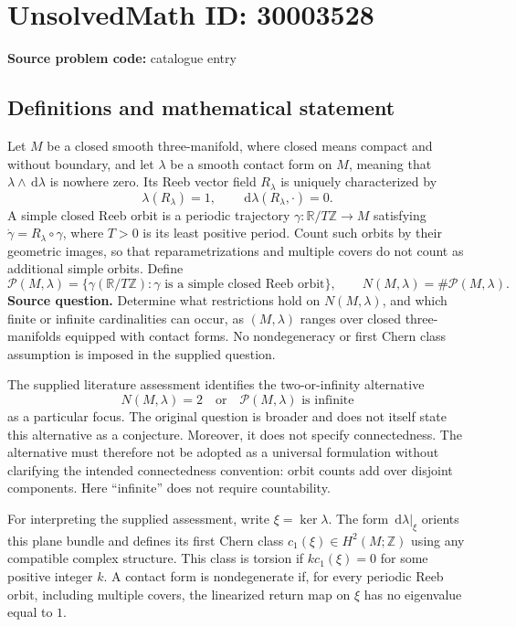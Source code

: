 \documentclass[11pt]{article}
\newcommand{\Z}{\mathbb{Z}}
\newcommand{\R}{\mathbb{R}}
\newcommand{\dd}{\,\mathrm{d}}
\begin{document}
\section*{UnsolvedMath ID: 30003528}
\textbf{Source problem code:} catalogue entry
\subsection{Definitions and mathematical statement}
Let \(M\) be a closed smooth three-manifold, where closed means compact and without boundary, and let \(\lambda\) be a smooth contact form on \(M\), meaning that \(\lambda\wedge\dd\lambda\) is nowhere zero. Its Reeb vector field \(R_\lambda\) is uniquely characterized by
\[
\lambda(R_\lambda)=1,\qquad \dd\lambda(R_\lambda,\cdot)=0.
\]
A simple closed Reeb orbit is a periodic trajectory \(\gamma:\R/T\Z\to M\) satisfying \(\dot\gamma=R_\lambda\circ\gamma\), where \(T>0\) is its least positive period. Count such orbits by their geometric images, so that reparametrizations and multiple covers do not count as additional simple orbits. Define
\[
\mathcal P(M,\lambda)=\{\gamma(\R/T\Z):\gamma\text{ is a simple closed Reeb orbit}\},\qquad
N(M,\lambda)=\#\mathcal P(M,\lambda).
\]
\textbf{Source question.} Determine what restrictions hold on \(N(M,\lambda)\), and which finite or infinite cardinalities can occur, as \((M,\lambda)\) ranges over closed three-manifolds equipped with contact forms. No nondegeneracy or first Chern class assumption is imposed in the supplied question.

The supplied literature assessment identifies the two-or-infinity alternative
\[
N(M,\lambda)=2\quad\text{or}\quad \mathcal P(M,\lambda)\text{ is infinite}
\]
as a particular focus. The original question is broader and does not itself state this alternative as a conjecture. Moreover, it does not specify connectedness. The alternative must therefore not be adopted as a universal formulation without clarifying the intended connectedness convention: orbit counts add over disjoint components. Here ``infinite'' does not require countability.

For interpreting the supplied assessment, write \(\xi=\ker\lambda\). The form \(\dd\lambda|_\xi\) orients this plane bundle and defines its first Chern class \(c_1(\xi)\in H^2(M;\Z)\) using any compatible complex structure. This class is torsion if \(k c_1(\xi)=0\) for some positive integer \(k\). A contact form is nondegenerate if, for every periodic Reeb orbit, including multiple covers, the linearized return map on \(\xi\) has no eigenvalue equal to \(1\).
\end{document}
